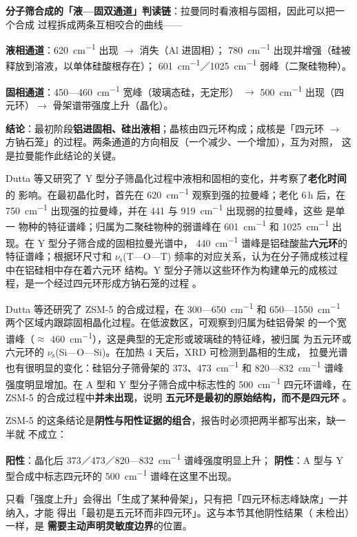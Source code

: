 \begin{dataflow}
\textbf{分子筛合成的「液—固双通道」判读链}：拉曼同时看液相与固相，因此可以把一个合成
过程拆成两条互相咬合的曲线——

\textbf{液相通道}：\qty{620}{cm^{-1}} 出现 $\rightarrow$ 消失（Al 进固相）；
\qty{780}{cm^{-1}} 出现并增强（硅被释放到溶液，以单体硅酸根存在）；
\qty{601}{cm^{-1}}／\qty{1025}{cm^{-1}} 弱峰（二聚硅物种）。

\textbf{固相通道}：450—\qty{460}{cm^{-1}} 宽峰（玻璃态硅，无定形）
$\rightarrow$ \qty{500}{cm^{-1}} 出现（四元环）$\rightarrow$ 骨架谱带强度上升（晶化）。

\textbf{结论}：最初阶段\textbf{铝进固相、硅出液相}；晶核由四元环构成；成核是「四元环
$\rightarrow$ 方钠石笼」的过程。两条通道的方向相反（一个减少、一个增加），互为对照，
这是拉曼能作此结论的关键。
\end{dataflow}

Dutta 等又研究了 Y 型分子筛晶化过程中液相和固相的变化，并考察了\textbf{老化时间}的
影响。在最初晶化时，首先在 \qty{620}{cm^{-1}} 观察到强的拉曼峰；老化 6\,h 后，在
\qty{750}{cm^{-1}} 出现强的拉曼峰，并在 441 与 \qty{919}{cm^{-1}} 出现弱的拉曼峰，这些
是单一  物种的特征谱峰；归属为二聚硅物种的弱谱峰在
\qty{601}{cm^{-1}} 和 \qty{1025}{cm^{-1}} 出现。在 Y 型分子筛合成的固相拉曼光谱中，
\qty{440}{cm^{-1}} 谱峰是铝硅酸盐\textbf{六元环}的特征谱峰；根据环尺寸和
$\nu_{\mathrm{s}}$(T—O—T) 频率的对应关系，认为在分子筛成核过程中在铝硅相中存在着六元环
结构。Y 型分子筛以这些环作为构建单元的成核过程，是一个经过四元环形成方钠石笼的过程
。

Dutta 等还研究了 ZSM-5 的合成过程，在 300—\qty{650}{cm^{-1}} 和
650—\qty{1550}{cm^{-1}} 两个区域内跟踪固相晶化过程。在低波数区，可观察到归属为硅铝骨架
的一个宽谱峰（$\approx$ \qty{460}{cm^{-1}}），这是典型的无定形或玻璃硅的特征峰，被归属
为五元环或六元环的 $\nu_{\mathrm{s}}$(Si—O—Si)。在加热 4 天后，XRD 可检测到晶相的生成，
拉曼光谱也有很明显的变化：硅铝分子筛骨架的 373、\qty{473}{cm^{-1}} 和
820—\qty{832}{cm^{-1}} 谱峰强度明显增加。在 A 型和 Y 型分子筛合成中标志性的
\qty{500}{cm^{-1}} 四元环谱峰，在 ZSM-5 的合成过程中\textbf{并未出现}，说明
\textbf{五元环是最初的原始结构，而不是四元环}
。

\begin{pitfall}
ZSM-5 的这条结论是\textbf{阴性与阳性证据的组合}，报告时必须把两半都写出来，缺一半就
不成立：

\textbf{阳性}：晶化后 373／473／820—\qty{832}{cm^{-1}} 谱峰强度明显上升；
\textbf{阴性}：A 型与 Y 型合成中标志四元环的 \qty{500}{cm^{-1}} 谱峰在这里不出现。

只看「强度上升」会得出「生成了某种骨架」，只有把「四元环标志峰缺席」一并纳入，才能
得出「最初是五元环而非四元环」。这与本节其他阴性结果（ 未检出）一样，是
\textbf{需要主动声明灵敏度边界}的位置。
\end{pitfall}

